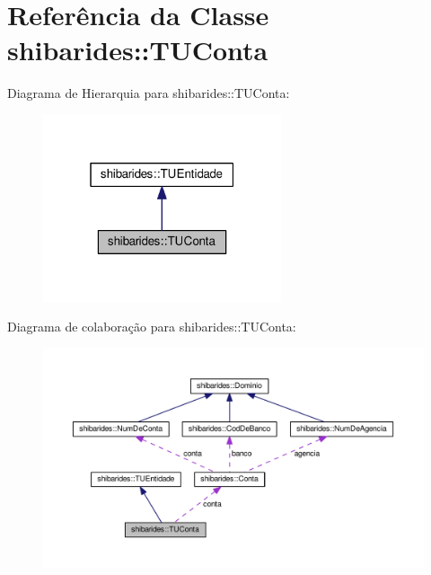 \hypertarget{classshibarides_1_1TUConta}{}\section{Referência da Classe shibarides\+:\+:T\+U\+Conta}
\label{classshibarides_1_1TUConta}


Diagrama de Hierarquia para shibarides\+:\+:T\+U\+Conta\+:\nopagebreak
\begin{figure}[H]
\begin{center}
\leavevmode
\includegraphics[width=199pt]{classshibarides_1_1TUConta__inherit__graph}
\end{center}
\end{figure}


Diagrama de colaboração para shibarides\+:\+:T\+U\+Conta\+:
\nopagebreak
\begin{figure}[H]
\begin{center}
\leavevmode
\includegraphics[width=350pt]{classshibarides_1_1TUConta__coll__graph}
\end{center}
\end{figure}
